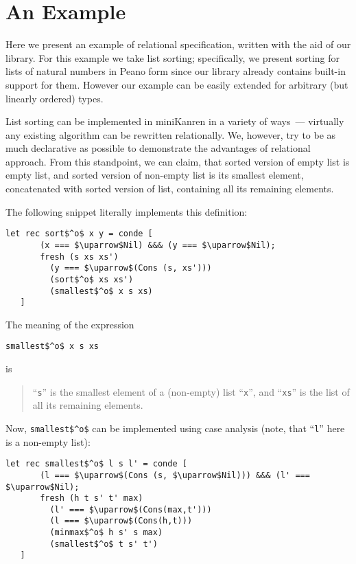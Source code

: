 \section{An Example}
\label{example}

Here we present an example of relational specification, written with the aid of our library. 
For this example we take list sorting; specifically, we present sorting for lists of
natural numbers in Peano form since our library already contains built-in
support for them. However our example can be easily extended for arbitrary (but
linearly ordered) types.

List sorting can be implemented in miniKanren in a variety of ways~--- 
virtually any existing algorithm can be rewritten relationally. We, however, 
try to be as much declarative as possible to demonstrate the
advantages of relational approach. From this standpoint, we can
claim, that sorted version of empty list is empty list, and sorted version
of non-empty list is its smallest element, concatenated with sorted
version of list, containing all its remaining elements.

The following snippet literally implements this definition:

\begin{lstlisting}[mathescape=true]
   let rec sort$^o$ x y = conde [
       (x === $\uparrow$Nil) &&& (y === $\uparrow$Nil);
       fresh (s xs xs')
         (y === $\uparrow$(Cons (s, xs')))
         (sort$^o$ xs xs')       
         (smallest$^o$ x s xs)
   ]
\end{lstlisting}

The meaning of the expression

\begin{lstlisting}[mathescape=true]
   smallest$^o$ x s xs
\end{lstlisting}

is

\begin{quotation}
\noindent ``\lstinline{s}'' is the smallest element of a (non-empty) list ``\lstinline{x}'', and 
``\lstinline{xs}'' is the list of all its remaining elements.
\end{quotation}

Now, \lstinline[mathescape=true]{smallest$^o$} can be implemented
using case analysis (note, that ``\lstinline{l}'' here is a non-empty 
list):

\begin{lstlisting}[mathescape=true]
   let rec smallest$^o$ l s l' = conde [       
       (l === $\uparrow$(Cons (s, $\uparrow$Nil))) &&& (l' === $\uparrow$Nil);
       fresh (h t s' t' max)
         (l' === $\uparrow$(Cons(max,t')))
         (l === $\uparrow$(Cons(h,t)))
         (minmax$^o$ h s' s max)
         (smallest$^o$ t s' t')
   ] 
\end{lstlisting}

